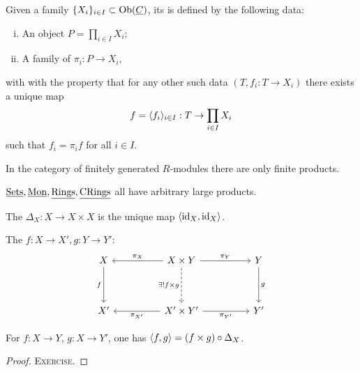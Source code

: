 \begin{definition*}
	Given a family \( \{X_i\}_{i \in I} \subset \operatorname{Ob}(\underline{C}) \), its  is defined by the following data:
	\begin{enumerate}[i)]
		\item An object \( P = \prod_{i \in I} X_i \);
		\item A family of  \( \pi_i: P \to X_i \),
	\end{enumerate}
	with with the property that for any other such data \( (T, f_i: T \to X_i) \) there exists a unique map
	\[
		f = \langle f_i \rangle_{i \in I} : T \to \prod_{i \in I} X_i
	\]
	such that \( f_i = \pi_i f \) for all \( i \in I \).
\end{definition*}

\begin{examples*}
	\item In the category of finitely generated \( R \)-modules there are only finite products.
	\item \( \underline{\mathrm{Sets}}, \underline{\mathrm{Mon}}, \underline{\mathrm{Rings}}, \underline{\mathrm{CRings}} \) all have arbitrary large products.
\end{examples*}

\begin{definition*}
	The  \( \Delta_X: X \to X \times X \) is the unique map \( \langle \mathrm{id}_X, \mathrm{id}_X \rangle \).
\end{definition*}

\begin{definition*}
	The  \( f: X \to X', g: Y \to Y' \):
	\[
		\begin{tikzcd}
			X && {X \times Y} && Y \\
			\\
			{X'} && {X' \times Y'} && {Y'}
			\arrow["f"', from=1-1, to=3-1]
			\arrow["{\pi_X}"', from=1-3, to=1-1]
			\arrow["{\pi_Y}", from=1-3, to=1-5]
			\arrow["\exists!{f \times g}"', dashed, from=1-3, to=3-3]
			\arrow["g", from=1-5, to=3-5]
			\arrow["{\pi_{X'}}", from=3-3, to=3-1]
			\arrow["{\pi_{Y'}}"', from=3-3, to=3-5]
		\end{tikzcd}
	\]
\end{definition*}

\begin{proposition*}
	For \( f: X \to Y \), \( g: X \to Y' \), one has \( \langle f, g \rangle = (f \times g) \circ \Delta_X \).
\end{proposition*}
\begin{proof}
	\textsc{Exercise}.
\end{proof}


